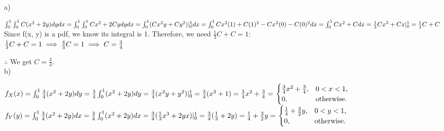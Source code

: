 \begin{solution} \ \\
a) 

$\int_{0}^{1}\int_{0}^{1} C(x^2 + 2y) dy dx\\
= \int_{0}^{1}\int_{0}^{1} Cx^2 + 2Cy dy dx\\
= \int_{0}^{1} (Cx^2y + Cy^2)\rvert_0^1 dx\\
= \int_{0}^{1} Cx^2(1) + C(1)^2 - Cx^2(0) - C(0)^2 dx\\
= \int_{0}^{1} Cx^2 + C dx\\
= \frac{1}{3}Cx^3 + Cx \rvert_0^1\\
= \frac{1}{3}C + C\\$
Since f(x, y) is a pdf, we know its integral is 1. Therefore, we need $\frac{1}{3}C + C = 1$:\\
$\frac{1}{3}C + C = 1\\
\implies \frac{4}{3}C = 1\\
\implies C = \frac{3}{4}\\$

$\therefore$ We get $C = \frac{3}{4}$.\\

b) 

$f_X(x) = \int_{0}^{1} \frac{3}{4}(x^2 + 2y) dy\\
= \frac{3}{4}\int_{0}^{1} (x^2 + 2y) dy\\
= \frac{3}{4} (x^2y + y^2)\rvert_0^1\\
= \frac{3}{4} (x^2 + 1)\\
= \frac{3}{4}x^2 + \frac{3}{4}\\
= \left.
\begin{cases}
\frac{3}{4}x^2 + \frac{3}{4}, &\text{$0 < x < 1$,} \\
0,    &\text{otherwise.}
\end{cases}
\right.$\\

$f_Y(y) = \int_{0}^{1} \frac{3}{4}(x^2 + 2y) dx\\
= \frac{3}{4}\int_{0}^{1} (x^2 + 2y) dx\\
= \frac{3}{4} (\frac{1}{3}x^3 + 2yx)\rvert_0^1\\
= \frac{3}{4} (\frac{1}{3} + 2y)\\
= \frac{1}{4} + \frac{3}{2}y\\
= \left.
\begin{cases}
\frac{1}{4} + \frac{3}{2}y, &\text{$0 < y < 1$,} \\
0,    &\text{otherwise.}
\end{cases}
\right.$\\


\end{solution}

